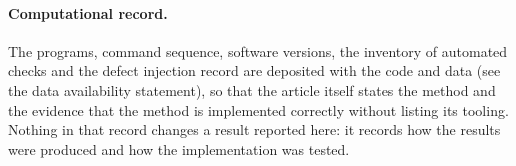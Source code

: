 \paragraph{Computational record.}  \label{app:checks} The programs, command
sequence, software versions, the inventory of automated checks and the defect
injection record are deposited with the code and data (see the data availability statement), so that the
article itself states the method and the evidence that the method is
implemented correctly without listing its tooling.  Nothing in that record
changes a result reported here: it records how the results were produced and how
the implementation was tested.

